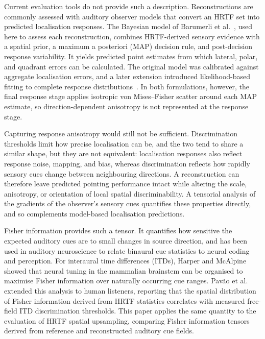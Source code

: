 \documentclass[journal]{IEEEtran}
\begin{document}
Current evaluation tools do not provide such a description. Reconstructions are commonly assessed with auditory observer models that convert an HRTF set into predicted localisation responses. The Bayesian model of Barumerli et al.~\cite{Barumerli2023}, used here to assess each reconstruction, combines HRTF-derived sensory evidence with a spatial prior, a maximum a posteriori (MAP) decision rule, and post-decision response variability. It yields predicted point estimates from which lateral, polar, and quadrant errors can be calculated. The original model was calibrated against aggregate localisation errors, and a later extension introduced likelihood-based fitting to complete response distributions~\cite{Barumerli2026}. In both formulations, however, the final response stage applies isotropic von Mises--Fisher scatter around each MAP estimate, so direction-dependent anisotropy is not represented at the response stage.

Capturing response anisotropy would still not be sufficient. Discrimination thresholds limit how precise localisation can be, and the two tend to share a similar shape, but they are not equivalent: localisation responses also reflect response noise, mapping, and bias, whereas discrimination reflects how rapidly sensory cues change between neighbouring directions. A reconstruction can therefore leave predicted pointing performance intact while altering the scale, anisotropy, or orientation of local spatial discriminability. A tensorial analysis of the gradients of the observer's sensory cues quantifies these properties directly, and so complements model-based localisation predictions.

Fisher information provides such a tensor. It quantifies how sensitive the expected auditory cues are to small changes in source direction, and has been used in auditory neuroscience to relate binaural cue statistics to neural coding and perception. For interaural time differences (ITDs), Harper and McAlpine~\cite{Harper2004} showed that neural tuning in the mammalian brainstem can be organised to maximise Fisher information over naturally occurring cue ranges. Pav\~ao et al.~\cite{Pavao2020} extended this analysis to human listeners, reporting that the spatial distribution of Fisher information derived from HRTF statistics correlates with measured free-field ITD discrimination thresholds. This paper applies the same quantity to the evaluation of HRTF spatial upsampling, comparing Fisher information tensors derived from reference and reconstructed auditory cue fields.
\end{document}
